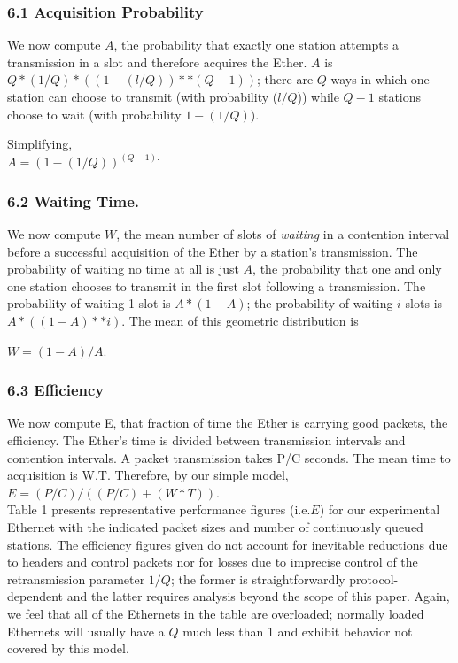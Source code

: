 
\subsubsection{6.1 Acquisition Probability}

We now compute $A$, the probability that exactly one station attempts a transmission in a slot and therefore acquires the Ether. $A$ is $Q *(1/Q)*((1-(l/Q))**(Q-1))$; there are $Q$ ways in which one station can choose to transmit (with probability ($l/Q$)) while $Q-1$ stations choose to wait (with probability $1 -(1/Q)$). 

Simplifying,\\

$A = (1-(1/Q))^{(Q-1).}$



\subsubsection{6.2 Waiting Time.}
We now compute $W$, the mean number of slots of \emph{waiting} in a contention interval before a successful acquisition of the Ether by a station's transmission. The probability of waiting no time at all is just $A$, the probability that one and only one station chooses to transmit in the first slot following a transmission. The probability of waiting 1 slot is $A*(1 - A)$; the probability of waiting $i$ slots is $A*((1-A)**i)$. The mean of this geometric distribution is

$W = (1-A)/A$.

\subsubsection{6.3 Efficiency}
We now compute E, that fraction of time the Ether is carrying good packets, the efficiency. The Ether's time is divided between transmission intervals and contention intervals. A packet transmission takes P/C seconds. The mean time to acquisition is W,T. Therefore, by our simple model, \\

$E = (P/C)/((P/C) + (W*T)).$ \\

Table 1 presents representative performance figures (i.e.$ E$) for our experimental Ethernet with the indicated packet sizes and number of continuously queued stations. The efficiency figures given do not account for inevitable reductions due to headers and control packets nor for losses due to imprecise control of the retransmission parameter $1/Q$; the former is straightforwardly protocol-dependent and the latter requires analysis beyond the scope of this paper. Again, we feel that all of the Ethernets in the table are overloaded; normally loaded Ethernets will usually have a $Q$ much less than 1 and exhibit behavior not covered by this model.

